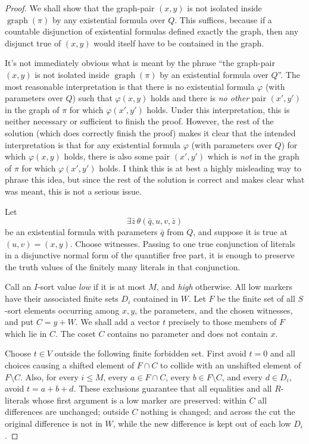 \documentclass[12pt]{article}
\newcommand{\review}[1]{\begin{reviewbox}#1\end{reviewbox}}
\begin{document}
\begin{proof}
We shall show that the graph-pair $(x,y)$ is not isolated inside
$\operatorname{graph}(\pi)$ by any existential formula over $Q$.   This suffices, because if a countable disjunction of existential formulas
defined exactly the graph, then any disjunct true of $(x,y)$ would itself
have to be contained in the graph.
\review{It's not immediately obvious what is meant by the phrase ``the graph-pair $(x, y)$ is not isolated inside $\operatorname{graph}(\pi)$ by an existential formula over $Q$''. The most reasonable interpretation is that there is no existential formula $\varphi$ (with parameters over $Q$) such that $\varphi(x, y)$ holds and there is \emph{no other} pair $(x', y')$ in the graph of $\pi$ for which $\varphi(x', y')$ holds. Under this interpretation, this is neither necessary or sufficient to finish the proof. However, the rest of the solution (which does correctly finish the proof) makes it clear that the intended interpretation is that for any existential formula $\varphi$ (with parameters over $Q$) for which $\varphi(x, y)$ holds, there is also some pair $(x', y')$ which is \emph{not} in the graph of $\pi$ for which $\varphi(x', y')$ holds. I think this is at best a highly misleading way to phrase this idea, but since the rest of the solution is correct and makes clear what was meant, this is not a serious issue.} 


Let
\[
        \exists \bar z\,\theta(\bar q,u,v,\bar z)
\]
be an existential formula with parameters $\bar q$ from $Q$, and suppose
it is true at $(u,v)=(x,y)$.  Choose witnesses.  Passing to one true
conjunction of literals in a disjunctive normal form of the quantifier
free part, it is enough to preserve the truth values of the finitely many
literals in that conjunction.

Call an $I$-sort value \emph{low} if it is at most $M$, and
\emph{high} otherwise.  All low markers have their associated finite
sets $D_i$ contained in $W$.  Let $F$ be the finite set of all $S$-sort
elements occurring among $x,y$, the parameters, and the chosen witnesses,
and put $C=y+W$.  We shall add a vector $t$ precisely to those members of
$F$ which lie in $C$.  The coset $C$ contains no parameter and does not
contain $x$.

Choose $t\in V$ outside the following finite forbidden set.  First avoid
$t=0$ and all choices causing a shifted element of $F\cap C$ to collide
with an unshifted element of $F\setminus C$.  Also, for every
$i\le M$, every $a\in F\cap C$, every $b\in F\setminus C$, and every
$d\in D_i$, avoid $t=a+b+d$.  These exclusions guarantee that all
equalities and all $R$-literals whose first argument is a low marker are
preserved: within $C$ all differences are unchanged; outside $C$ nothing
is changed; and across the cut the original difference is not in $W$,
while the new difference is kept out of each low $D_i$.


\end{proof}
\end{document}
